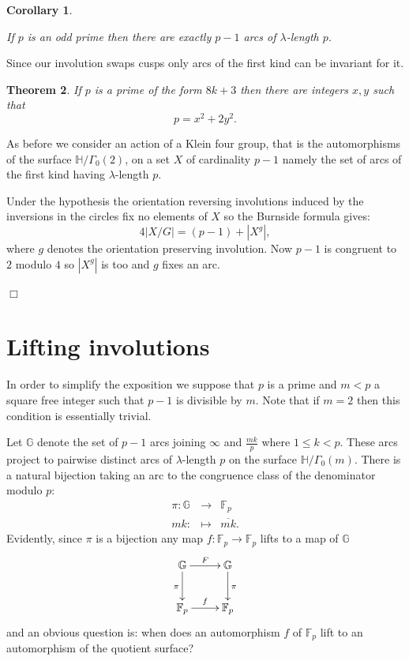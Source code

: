 \documentclass[12pt,a4paper]{amsart}
\newtheorem{thm}{Theorem}[section]
\newtheorem{coro}[thm]{Corollary}
\def\GG{\mathbb{G}}
\def\fp{\mathbb{F}_p}
\begin{document}
\begin{coro}\label{hecke lambda lengths}
	
	If $p$ is an odd prime then there are exactly
	$p-1$ arcs of $\lambda$-length $p$.
\end{coro}

Since our involution swaps cusps only arcs of the first  kind can be invariant for it.


\begin{thm}
	If $p$ is a prime of the form $8k+3$ 
	then there are integers $x,y$ such that
	$$p = x^2 + 2 y^2.$$
\end{thm}

\proof As  before we consider an action of a Klein four group,
that is the automorphisms of the surface $\mathbb{H}/\Gamma_0(2)$,
on a set $X$ of cardinality $p-1$ namely the set of arcs of the first
kind having $\lambda$-length $p$.

Under the hypothesis the 
orientation reversing involutions
induced by the inversions in the circles
fix no elements of $X$ so the Burnside formula gives:
$$4 |X/G|   = (p-1) +  |X^g|,$$
where $g$ denotes the orientation preserving involution.
Now $p-1$ is congruent to $2$ modulo $4$ so $|X^g|$ 
is too and $g$ fixes an arc.

\hfill $\Box$

\section{Lifting involutions}\label{lifting involutions}

In order to simplify the  exposition we suppose that $p$ is a prime
and $m<p$ a square free integer such that $p-1$ is divisible by $m$.
Note that if $m=2$ then this condition is essentially trivial.


Let $\GG$ denote the set of $p-1$ arcs joining $\infty$ and $\frac{mk}{p}$
where $1\leq k < p$.
These arcs project to pairwise distinct arcs
of $\lambda$-length $p$ on the surface
$\mathbb{H}/\Gamma_0(m)$.
There is a natural bijection
taking an arc to the congruence class of the denominator modulo $p$:
\begin{eqnarray*}
	\pi:\GG& \rightarrow & \fp \\
	mk : & \mapsto& \overline{mk}.
\end{eqnarray*}
Evidently, since $\pi$ is a bijection any map $f:\fp\rightarrow	\fp$
lifts to a map of $\GG$
\[
\xymatrix{
\GG \ar[r]^{F} \ar[d]_{\pi} & \GG \ar[d]^{\pi} \\
\fp \ar[r]^{f} & \fp
}
\]	
and an obvious question is:
when does an automorphism $f$ of $\fp$
lift to an automorphism of the quotient surface?
\end{document}
